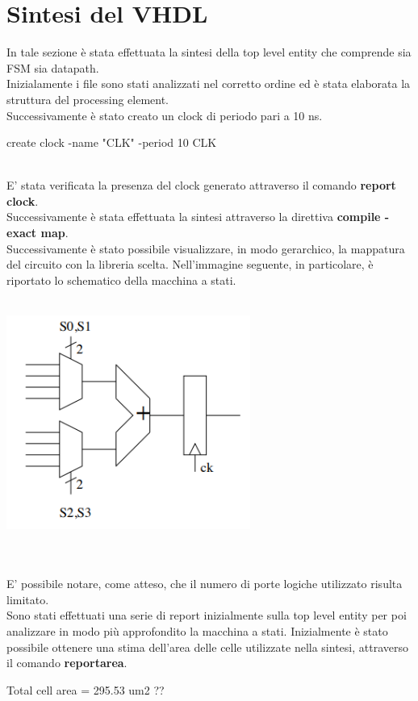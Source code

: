 \documentclass[11pt,  english, makeidx, a4paper, titlepage, oneside]{book}
\begin{document}
\section{Sintesi del VHDL} 
In tale sezione è stata effettuata la sintesi della top level entity che comprende sia FSM sia datapath.
\\
Inizialamente i file sono stati analizzati nel corretto ordine ed è stata elaborata la struttura del processing element.
\\
Successivamente è stato creato un clock di periodo pari a 10 ns.
\\
\centerline{create clock -name "CLK" -period 10 {CLK}} 
\\
E' stata verificata la presenza del clock generato attraverso il comando \textbf{report clock}.
\\
Successivamente è stata effettuata la sintesi attraverso la direttiva \textbf{compile -exact map}.
\\
Successivamente è stato possibile visualizzare, in modo gerarchico, la mappatura del circuito con la libreria scelta. Nell'immagine seguente, in particolare, è riportato lo schematico della macchina a stati.
\\\\
\centerline{\includegraphics[width=8cm]{./img/Lab_2/Datapath.png}}
\\\\ 
E' possibile notare, come atteso, che il numero di porte logiche utilizzato risulta limitato.
\\
Sono stati effettuati una serie di report inizialmente sulla top level entity per poi analizzare in modo più approfondito la macchina a stati.
Inizialmente è stato possibile ottenere una stima dell'area delle celle utilizzate nella sintesi, attraverso il comando \textbf{reportarea}.
\\
\centerline{Total cell area = 295.53 um2 ??}
\end{document}
